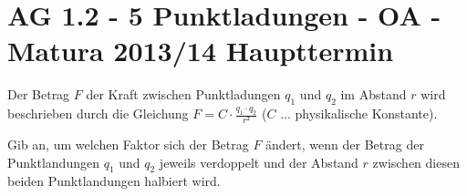 \section{AG 1.2 - 5 Punktladungen - OA - Matura 2013/14 Haupttermin}

\begin{beispiel}[AG 1.2]{1} %
				Der Betrag $F$ der Kraft zwischen Punktladungen $q_1$ und $q_2$ im Abstand $r$ wird beschrieben durch die Gleichung $F=C\cdot \frac{q_1\cdot q_2}{r²}$ ($C$ ... physikalische Konstante).
				
				Gib an, um welchen Faktor sich der Betrag $F$ ändert, wenn der Betrag der Punktlandungen $q_1$ und $q_2$ jeweils verdoppelt und der Abstand $r$ zwischen diesen beiden Punktlandungen halbiert wird.\leer
				
\end{beispiel}